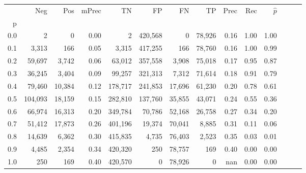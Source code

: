 \begin{tabular}{rrrrrrrrrrrrrr}
\toprule
{} &      Neg &     Pos & mPrec &       TN &       FP &      FN &      TP &  Prec &   Rec & $\hat{p}$ \\
p   &          &         &       &          &          &         &         &       &       &           \\
\midrule
0.0 &        2 &       0 &  0.00 &        2 &  420,568 &       0 &  78,926 &  0.16 &  1.00 &      1.00 \\
0.1 &    3,313 &     166 &  0.05 &    3,315 &  417,255 &     166 &  78,760 &  0.16 &  1.00 &      0.99 \\
0.2 &   59,697 &   3,742 &  0.06 &   63,012 &  357,558 &   3,908 &  75,018 &  0.17 &  0.95 &      0.87 \\
0.3 &   36,245 &   3,404 &  0.09 &   99,257 &  321,313 &   7,312 &  71,614 &  0.18 &  0.91 &      0.79 \\
0.4 &   79,460 &  10,384 &  0.12 &  178,717 &  241,853 &  17,696 &  61,230 &  0.20 &  0.78 &      0.61 \\
0.5 &  104,093 &  18,159 &  0.15 &  282,810 &  137,760 &  35,855 &  43,071 &  0.24 &  0.55 &      0.36 \\
0.6 &   66,974 &  16,313 &  0.20 &  349,784 &   70,786 &  52,168 &  26,758 &  0.27 &  0.34 &      0.20 \\
0.7 &   51,412 &  17,873 &  0.26 &  401,196 &   19,374 &  70,041 &   8,885 &  0.31 &  0.11 &      0.06 \\
0.8 &   14,639 &   6,362 &  0.30 &  415,835 &    4,735 &  76,403 &   2,523 &  0.35 &  0.03 &      0.01 \\
0.9 &    4,485 &   2,354 &  0.34 &  420,320 &      250 &  78,757 &     169 &  0.40 &  0.00 &      0.00 \\
1.0 &      250 &     169 &  0.40 &  420,570 &        0 &  78,926 &       0 &   nan &  0.00 &      0.00 \\
\bottomrule
\end{tabular}
